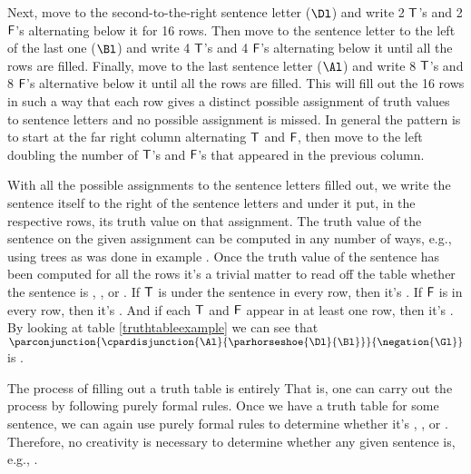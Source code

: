 Next, move to the second-to-the-right sentence letter ($\Dl$) and write 2 $\mathsf{T}$'s and 2 $\mathsf{F}$'s alternating below it for 16 rows. 
Then move to the sentence letter to the left of the last one ($\Bl$) and write 4 $\mathsf{T}$'s and 4 $\mathsf{F}$'s alternating below it until all the rows are filled. 
Finally, move to the last sentence letter ($\Al$) and write 8 $\mathsf{T}$'s and 8 $\mathsf{F}$'s alternative below it until all the rows are filled. 
This will fill out the 16 rows in such a way that each row gives a distinct possible assignment of truth values to sentence letters and no possible assignment is missed. 
In general the pattern is to start at the far right column alternating $\mathsf{T}$ and $\mathsf{F}$, then move to the left doubling the number of $\mathsf{T}$'s and $\mathsf{F}$'s that appeared in the previous column. 

With all the possible assignments to the sentence letters filled out, we write the sentence itself to the right of the sentence letters and under it put, in the respective rows, its truth value on that assignment. 
The truth value of the sentence on the given assignment can be computed in any number of ways, e.g., using trees as was done in example . 
Once the truth value of the sentence has been computed for all the rows it's a trivial matter to read off the table whether the sentence is , , or . 
If $\mathsf{T}$ is under the sentence in every row, then it's . 
If $\mathsf{F}$ is in every row, then it's .
And if each $\mathsf{T}$ and $\mathsf{F}$ appear in at least one row, then it's . 
By looking at table \ref{truthtableexample} we can see that $\parconjunction{\cpardisjunction{\Al}{\parhorseshoe{\Dl}{\Bl}}}{\negation{\Gl}}$ is .

The process of filling out a truth table is entirely   That is, one can carry out the process by following purely formal rules.  Once we have a truth table for some \GSL{} sentence, we can again use purely formal rules to determine whether it's , , or .  Therefore, no creativity is necessary to determine whether any given sentence is, e.g., .

